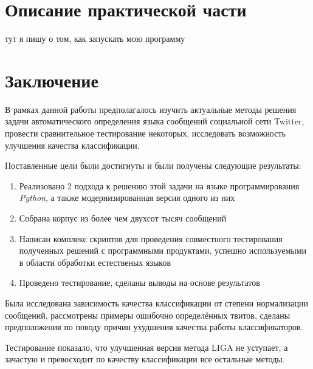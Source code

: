 \documentclass[a4paper, 14pt]{article}
\begin{document}
		

\section{Описание практической части}
		тут я пишу о том, как запускать мою программу

\pagebreak
	
\section{Заключение}
		В рамках данной работы предполагалось изучить актуальные методы решения задачи автоматического определения языка сообщений социальной сети Twitter, провести сравнительное тестирование некоторых, исследовать возможность улучшения качества классификации. 
		
		Поставленные цели были достигнуты и были получены следующие результаты:
		\begin{enumerate}
			\item Реализовано 2 подхода к решению этой задачи на языке программирования \textit{Python}, а также модернизированная версия одного из них
			\item Собрана корпус из более чем двухсот тысяч сообщений
			\item Написан комплекс скриптов для проведения совместного тестирования полученных решений с программными продуктами, успешно используемыми в области обработки естественых языков
			\item Проведено тестирование, сделаны выводы на основе результатов
		\end{enumerate}
		Была исследована зависимость качества классификации от степени нормализации сообщений, 
		рассмотрены примеры ошибочно определённых твитов, сделаны предположения по поводу причин ухудшения качества работы классификаторов.
		
		Тестирование показало, что улучшенная версия метода LIGA не уступает, а зачастую и превосходит по качеству классификации все остальные методы.
		
		
\end{document}
